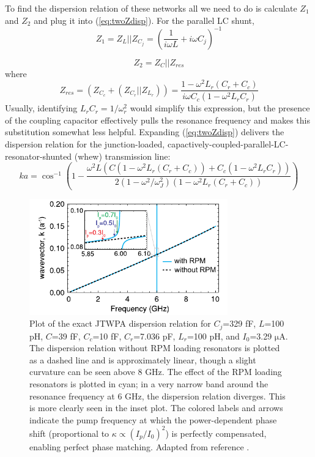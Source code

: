 To find the dispersion relation of these networks all we need to do is calculate $Z_1$ and $Z_2$ and plug it into (\ref{eq:twoZdisp}).  For the parallel LC shunt,
\begin{equation}
Z_1 = Z_L || Z_{C_j} = \left( \frac{1}{i \omega L} + i \omega C_j \right)^{-1}
\label{eq:Z1_parallel}
\end{equation}

\begin{equation}
Z_2 = Z_C || Z_{res}
\label{eq:Z2_parallel}
\end{equation}
where
\begin{equation}
Z_{res} = (Z_{C_c} + (Z_{C_r} || Z_{L_r})) = \frac{1 - \omega^2 L_r (C_r + C_c)}{i \omega C_c (1 - \omega^2 L_r C_r)}
\label{eq:Zres}
\end{equation}
Usually, identifying $L_r C_r = 1/\omega_r^2$ would simplify this expression, but the presence of the coupling capacitor effectively pulls the resonance frequency and makes this substitution somewhat less helpful.  Expanding (\ref{eq:twoZdisp}) delivers the dispersion relation for the junction-loaded, capactively-coupled-parallel-LC-resonator-shunted (whew) transmission line:
\begin{equation}
ka = \cos^{-1}\left( 1 - \frac{\omega^2 L (C ( 1 - \omega^2 L_r (C_r + C_c) ) + C_c (1 - \omega^2 L_r C_r) ) }{2(1 - \omega^2 / \omega_J^2)(1 - \omega^2 L_r (C_r + C_c))} \right)
\label{eq:fulldisp}
\end{equation}

\begin{figure}
\begin{center}
\includegraphics[width = 3.38in]{twpa_theory/disp_rpm}
\end{center}
\caption[JTWPA dispersion relation with and without RPM]{Plot of the exact JTWPA dispersion relation for $C_j$=329 fF, $L$=100 pH, $C$=39 fF, $C_c$=10 fF, $C_r$=7.036 pF, $L_r$=100 pH, and $I_0$=3.29 $\mathrm{\mu A}$.  The dispersion relation without RPM loading resonators is plotted as a dashed line and is approximately linear, though a slight curvature can be seen above 8 GHz.  The effect of the RPM loading resonators is plotted in cyan; in a very narrow band around the resonance frequency at 6 GHz, the dispersion relation diverges.  This is more clearly seen in the inset plot.  The colored labels and arrows indicate the pump frequency at which the power-dependent phase shift (proportional to $\kappa \propto (I_p/I_0)^2$) is perfectly compensated, enabling perfect phase matching.  Adapted from reference \cite{OBrien2014}.}
\label{fig:disp_rpm}
\end{figure}


